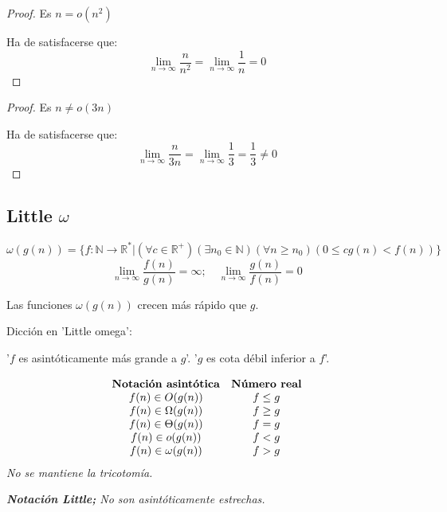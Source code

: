 \documentclass[tikz,11pt,fleqn]{book} %
\begin{document}
\begin{proof}
	Es $n=o(n^2)$

	Ha de satisfacerse que: $$
		\lim_{n\to\infty}\frac n{n^2}=\lim_{n\to\infty}\frac 1{n}=0
	$$
\end{proof}
\begin{proof}
	Es $n\neq o(3n)$

	Ha de satisfacerse que: $$
		\lim_{n\to\infty}\frac n{3n}=\lim_{n\to\infty}\frac 13=\frac 13\neq0
	$$
\end{proof}

\subsection{Little $\omega$}
\begin{definition}
	$$
		\omega (g(n)) = \{ f : \mathbb N \to \mathbb R^* | (\forall c\in \mathbb R^+) (\exists n_0\in \mathbb N) (\forall n\ge n_0) ( 0 \le  c g(n) < f(n) ) \}
	$$$$
		\lim_{n\to\infty}\frac{f(n)}{g(n)}= \infty;\quad
		\lim_{n\to\infty}\frac{g(n)}{f(n)}= 0
	$$
\end{definition}
Las funciones $\omega({g(n)})$ crecen más rápido que $g$.
\begin{remark}Dicción en 'Little omega':

	'$f$ es asintóticamente más grande a $g$'. '$g$ es cota débil inferior a $f$'.
\end{remark}

\begin{theorem}
	$$\begin{array}{cc}
			\text{\textbf{Notación asintótica}} & \text{\textbf{Número real}} \\
			f(n) \in O(g(n))                    & f\le g                      \\
			f(n) \in \Omega(g(n))               & f\ge g                      \\
			f(n) \in \Theta(g(n))               & f= g                        \\
			f(n) \in o(g(n))                    & f< g                        \\
			f(n) \in \omega(g(n))               & f> g                        \\
		\end{array}$$
	\textit{No se mantiene la tricotomía.}
\end{theorem}

\begin{remark}
	\textit{\textbf{Notación Little;} No son asintóticamente estrechas.}
\end{remark}
\end{document}
